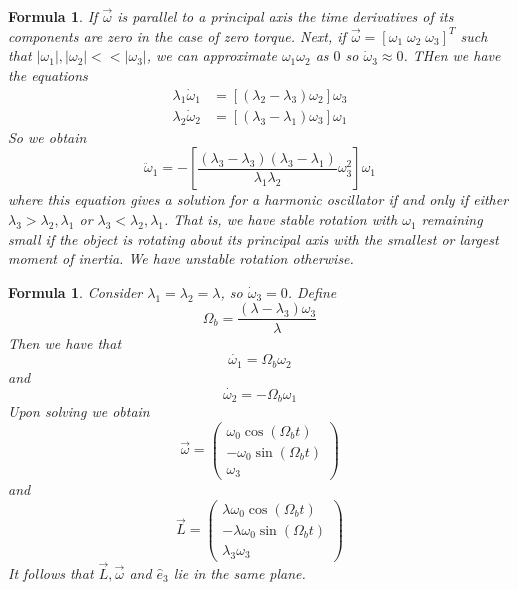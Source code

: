 \documentclass[12pt]{article}
\newtheorem{for}[thm]{Formula}
\theoremstyle{definition}
\theoremstyle{remark}
\numberwithin{equation}{section}
\begin{document}
\begin{for}
        If $\vec{\omega}$ is parallel to a principal axis the time derivatives of its components are zero in the case of zero torque. Next, if $\vec{\omega} = [\omega_1 \;\omega_2\;\omega_3]^T$ such that $|\omega_1|, |\omega_2| << |\omega_3|$, we can approximate $\omega_1\omega_2$ as $0$ so $\dot{\omega}_3 \approx 0$. THen we have the equations \begin{align}
                \lambda_1\dot{\omega}_1 &= [(\lambda_2-\lambda_3)\omega_2]\omega_3    \\ 
                \lambda_2\dot{\omega}_2 &= [(\lambda_3-\lambda_1)\omega_3]\omega_1  
        \end{align}
        So we obtain \begin{equation}
                \ddot{\omega}_1 = -\left[\frac{(\lambda_3 - \lambda_3)(\lambda_3 - \lambda_1)}{\lambda_1\lambda_2}\omega_3^2\right]\omega_1 
        \end{equation}
        where this equation gives a solution for a harmonic oscillator if and only if either $\lambda_3 > \lambda_2,\lambda_1$ or $\lambda_3 < \lambda_2,\lambda_1$. That is, we have stable rotation with $\omega_1$ remaining small if the object is rotating about its principal axis with the smallest or largest moment of inertia. We have unstable rotation otherwise.
\end{for}


\begin{for}
        Consider $\lambda_1 = \lambda_2 = \lambda$, so $\dot{\omega}_3 = 0$. Define \begin{equation}
                \Omega_b = \frac{(\lambda - \lambda_3)\omega_3}{\lambda}
        \end{equation}
        Then we have that \begin{equation}
                \dot{\omega_1} = \Omega_b\omega_2
        \end{equation}
        and \begin{equation}
                \dot{\omega_2} = -\Omega_b\omega_1
        \end{equation}
        Upon solving we obtain \begin{equation}
                \vec{\omega} = \begin{pmatrix} \omega_0\cos(\Omega_b t) \\ -\omega_0\sin(\Omega_bt) \\ \omega_3\end{pmatrix}
        \end{equation}
        and \begin{equation}
                \vec{L} = \begin{pmatrix}\lambda\omega_0\cos(\Omega_b t) \\ -\lambda\omega_0\sin(\Omega_bt) \\ \lambda_3\omega_3\end{pmatrix}
        \end{equation}
        It follows that $\vec{L}, \vec{\omega}$ and $\hat{e}_3$ lie in the same plane.
\end{for}









\end{document}
